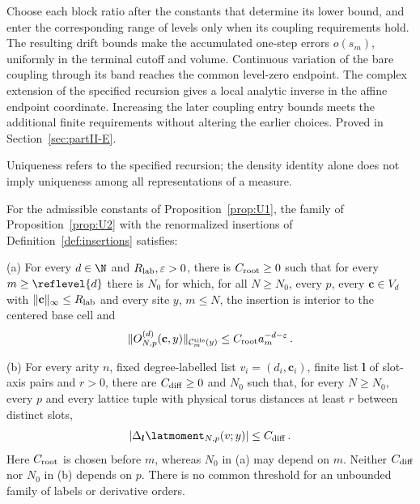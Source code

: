 Choose each block ratio after the constants that determine its lower bound,
and enter the corresponding range of levels only when its coupling requirements
hold. The resulting drift bounds make the accumulated one-step errors
$o(s_m)$, uniformly in the terminal cutoff and volume. Continuous variation of
the bare coupling through its band reaches the common level-zero endpoint.
The complex extension of the specified recursion gives a local analytic inverse
in the affine endpoint coordinate. Increasing the later coupling entry bounds
meets the additional finite requirements without altering the earlier choices.
Proved in Section~\ref{sec:partII-E}.

\begin{remark}
Uniqueness refers to the specified recursion; the density identity alone does not imply uniqueness among all representations of a measure.
\end{remark}

\begin{proposition}\label{prop:U3}
For the admissible constants of Proposition~\ref{prop:U1}, the family of Proposition~\ref{prop:U2} with the renormalized insertions of Definition~\ref{def:insertions} satisfies:

(a) For every $d\in\N$ and $R_{\rm lab},\varepsilon>0$, there is $C_{\rm root}\ge0$ such that for every $m\ge \reflevel{d}$ there is $N_0$ for which, for all $N\ge N_0$, every $p$, every $\mathbf c\in V_d$ with $\|\mathbf c\|_\infty\le R_{\rm lab}$ and every site $y$, $m\le N$, the insertion is interior to the centered base cell and
\begin{equation}\label{eq:U3-1}
\|O^{(d)}_{N,p}(\mathbf c,y)\|_{\mathcal C_m^{\rm tile}(y)}\le C_{\rm root}a_m^{-d-\varepsilon}\,.
\end{equation}

(b) For every arity $n$, fixed degree-labelled list $v_i=(d_i,\mathbf c_i)$, finite list $\boldsymbol l$ of slot-axis pairs and $r>0$, there are $C_{\rm diff}\ge0$ and $N_0$ such that, for every $N\ge N_0$, every $p$ and every lattice tuple with physical torus distances at least $r$ between distinct slots,
\begin{equation}\label{eq:U3-2}
|\Delta_{\boldsymbol l}\latmoment_{N,p}(v;y)|\le C_{\rm diff}\,.
\end{equation}
Here $C_{\rm root}$ is chosen before $m$, whereas $N_0$ in (a) may depend on $m$. Neither $C_{\rm diff}$ nor $N_0$ in (b) depends on $p$. There is no common threshold for an unbounded family of labels or derivative orders.
\end{proposition}

